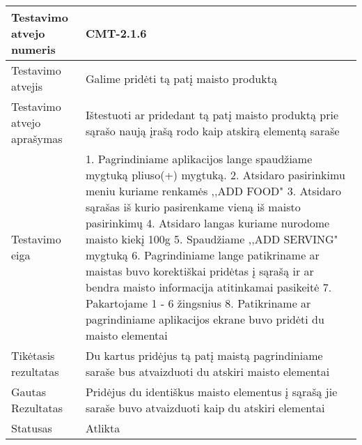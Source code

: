 \documentclass[oneside]{VUMIFPSkursinis}
\begin{document}
\begin{center}
    \begin{tabular}{ |p{5cm}|p{13cm}|}
    \hline
        Testavimo atvejo numeris &  CMT-2.1.6\\ \hline
        Testavimo atvejis & Galime pridėti tą patį maisto produktą  \\ \hline
        Testavimo atvejo aprašymas & Ištestuoti ar pridedant tą patį maisto produktą prie sąrašo naują įrašą rodo kaip atskirą elementą saraše  \\ \hline
        Testavimo eiga &  1. Pagrindiniame aplikacijos lange spaudžiame mygtuką pliuso(+) mygtuką. 
				2. Atsidaro pasirinkimu meniu kuriame renkamės ,,ADD FOOD"
				3. Atsidaro sąrašas iš kurio pasirenkame vieną iš maisto pasirinkimų
				4. Atsidaro langas kuriame nurodome maisto kiekį 100g
				5. Spaudžiame ,,ADD SERVING"  mygtuką
				6. Pagrindiniame lange patikriname ar maistas buvo korektiškai pridėtas į sąrašą ir ar bendra maisto informacija atitinkamai pasikeitė
				7. Pakartojame 1 - 6 žingsnius
				8. Patikriname ar pagrindiniame aplikacijos ekrane buvo pridėti du maisto elementai \\ \hline
        Tikėtasis rezultatas &  Du kartus pridėjus tą patį maistą pagrindiniame saraše bus atvaizduoti du atskiri maisto elementai\\ \hline
        Gautas Rezultatas &  Pridėjus du identiškus maisto elementus į sąrašą jie saraše buvo atvaizduoti kaip du atskiri elementai\\ \hline
        Statusas & Atlikta \\ \hline
    \hline
    \end{tabular}
\end{center}
\end{document}
